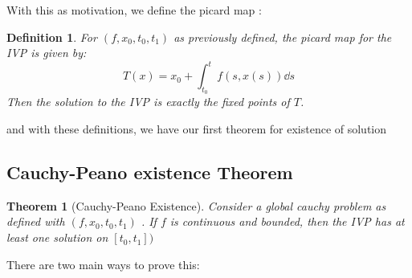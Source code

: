 \documentclass[a4paper, 12pt]{book}
\newtheorem{definition}{Definition}[chapter]
\newtheorem{theorem}{Theorem}[chapter]
\begin{document}
With this as motivation, we define the picard map :
\begin{definition}
	For \( (f,x_0,t_0,t_1) \) as previously defined, the picard map for the IVP is given by:
	\[
		T(x)=x_0+\int_{t_0}^{t} f(s,x(s)) \dd s
	\]
	Then the solution to the IVP is exactly the fixed points of \( T \).
\end{definition}
and with these definitions, we have our first theorem for existence of solution
\subsection{Cauchy-Peano existence Theorem}
\begin{theorem}
	[Cauchy-Peano Existence]
	Consider a global cauchy problem as defined with \( (f,x_0,t_0,t_1) \) . If \( f \) is continuous and  bounded, then the IVP has at least one solution on \( [t_0, t_1]) \)\end{theorem}
There are two main ways to prove this:
\end{document}

